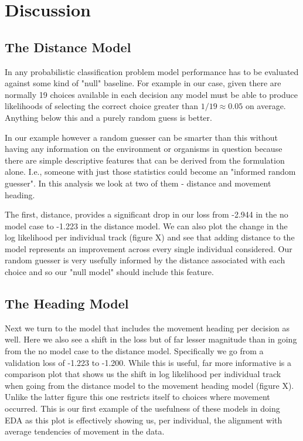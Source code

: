 \documentclass[11pt]{article}
\begin{document}
\section*{Discussion}

\subsection*{The Distance Model}


In any probabilistic classification problem model performance has to be evaluated against some kind of "null" baseline. For example in our case, given there are normally 19 choices available in each decision any model must be able to produce likelihoods of selecting the correct choice greater than $1/19\approx 0.05$ on average. Anything below this and a purely random guess is better. 

In our example however a random guesser can be smarter than this without having any information on the environment or organisms in question because there are simple descriptive features that can be derived from the formulation alone. I.e., someone with just those statistics could become an "informed random guesser". In this analysis we look at two of them - distance and movement heading. 

The first, distance, provides a significant drop in our loss from -2.944 in the no model case to -1.223 in the distance model. We can also plot the change in the log likelihood per individual track (figure X) and see that adding distance to the model represents an improvement across every single individual considered. Our random guesser is very usefully informed by the distance associated with each choice and so our "null model" should include this feature. 

\subsection*{The Heading Model}

Next we turn to the model that includes the movement heading per decision as well. Here we also see a shift in the loss but of far lesser magnitude than in going from the no model case to the distance model. Specifically we go from a validation loss of -1.223 to -1.200. While this is useful, far more informative is a comparison plot that shows us the shift in log likelihood per individual track when going from the distance model to the movement heading model (figure X). Unlike the latter figure this one restricts itself to choices where movement occurred. This is our first example of the usefulness of these models in doing EDA as this plot is effectively showing us, per individual, the alignment with average tendencies of movement in the data. 
\end{document}

